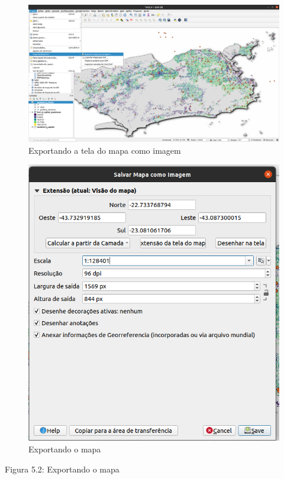\documentclass[
]{book}
\begin{document}
\begin{figure}
\centering
\includegraphics{media/modulo5/export-map-canvas-image.png}
\caption{Exportando a tela do mapa como imagem}
\end{figure}

\begin{figure}
\centering
\includegraphics{media/modulo5/export-map-canvas.png}
\caption{Exportando o mapa}
\end{figure}

Figura 5.2: Exportando o mapa
\end{document}
